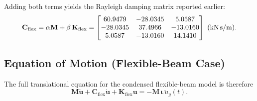 \documentclass[12pt,a4paper]{article}
\newcommand{\mat}[1]{\mathbf{#1}}
\newcommand{\vect}[1]{\mathbf{#1}}
\begin{document}
Adding both terms yields the Rayleigh damping matrix reported earlier:
\begin{equation}
  \mat{C}_{\text{flex}} = \alpha\mat{M} + \beta\,\mat{K}_{\text{flex}} = \begin{bmatrix}60.9479 & -28.0345 & 5.0587\\-28.0345 & 37.4966 & -13.0160\\5.0587 & -13.0160 & 14.1410\end{bmatrix}~(\text{kN\,s/m}).
\end{equation}

\subsection{Equation of Motion (Flexible-Beam Case)}
The full translational equation for the condensed flexible-beam model is therefore
\begin{equation}
  \mat{M}\ddot{\vect{u}} + \mat{C}_{\text{flex}}\dot{\vect{u}} + \mat{K}_{\text{flex}}\vect{u} = -\mat{M}\,\bm{\iota}\,\ddot{u}_g(t).
\end{equation}
\end{document}
